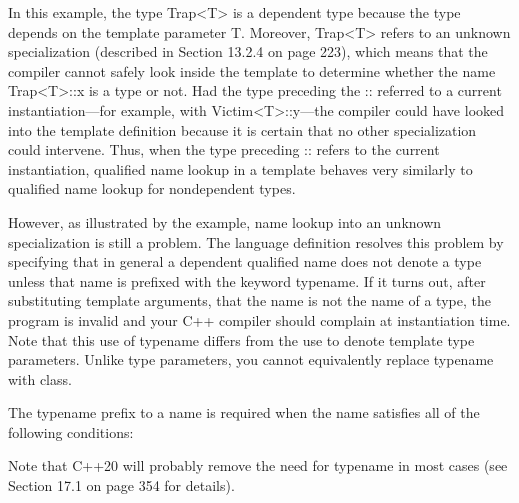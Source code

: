 In this example, the type Trap<T> is a dependent type because the type depends on the template parameter T. Moreover, Trap<T> refers to an unknown specialization (described in Section 13.2.4 on page 223), which means that the compiler cannot safely look inside the template to determine whether the name Trap<T>::x is a type or not. Had the type preceding the :: referred to a current instantiation—for example, with Victim<T>::y—the compiler could have looked into the template definition because it is certain that no other specialization could intervene. Thus, when the type preceding :: refers to the current instantiation, qualified name lookup in a template behaves very similarly to qualified name lookup for nondependent types.

However, as illustrated by the example, name lookup into an unknown specialization is still a problem. The language definition resolves this problem by specifying that in general a dependent qualified name does not denote a type unless that name is prefixed with the keyword typename. If it turns out, after substituting template arguments, that the name is not the name of a type, the program is invalid and your C++ compiler should complain at instantiation time. Note that this use of typename differs from the use to denote template type parameters. Unlike type parameters, you cannot equivalently replace typename with class.

The typename prefix to a name is required when the name satisfies all of the following conditions:

\begin{tcolorbox}[colback=webgreen!5!white,colframe=webgreen!75!black]
\hspace*{0.75cm}Note that C++20 will probably remove the need for typename in most cases (see Section 17.1 on page 354 for details).
\end{tcolorbox}

